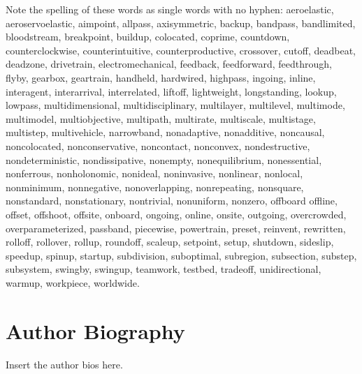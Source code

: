 \documentclass[letterpaper,12pt,peerreviewca,draftcls]{IEEEtran}
\begin{document}
Note the spelling of these words as single words with no hyphen:  aeroelastic, aeroservoelastic, aimpoint, allpass, axisymmetric, backup, bandpass, bandlimited, bloodstream, breakpoint, buildup, colocated, coprime, countdown, counterclockwise, counterintuitive, counterproductive, crossover, cutoff, deadbeat, deadzone, drivetrain, electromechanical, feedback, feedforward, feedthrough, flyby, gearbox, geartrain, handheld, hardwired, highpass, ingoing, inline, interagent, interarrival, interrelated, liftoff, lightweight, longstanding, lookup, lowpass, multidimensional, multidisciplinary, multilayer, multilevel, multimode, multimodel, multiobjective, multipath, multirate, multiscale, multistage, multistep, multivehicle, narrowband, nonadaptive, nonadditive, noncausal, noncolocated, nonconservative, noncontact, nonconvex, nondestructive, nondeterministic, nondissipative, nonempty, nonequilibrium, nonessential, nonferrous, nonholonomic, nonideal, noninvasive, nonlinear, nonlocal, nonminimum, nonnegative, nonoverlapping, nonrepeating, nonsquare, nonstandard, nonstationary, nontrivial, nonuniform, nonzero, offboard offline, offset, offshoot, offsite, onboard, ongoing, online, onsite, outgoing, overcrowded, overparameterized, passband, piecewise, powertrain, preset, reinvent, rewritten, rolloff, rollover, rollup, roundoff, scaleup, setpoint, setup, shutdown, sideslip, speedup, spinup, startup, subdivision, suboptimal, subregion, subsection, substep, subsystem, swingby, swingup, teamwork, testbed, tradeoff, unidirectional, warmup, workpiece, worldwide.
       	
%

\newpage
\section{Author Biography}
Insert the author bios here.
%
\end{document}
